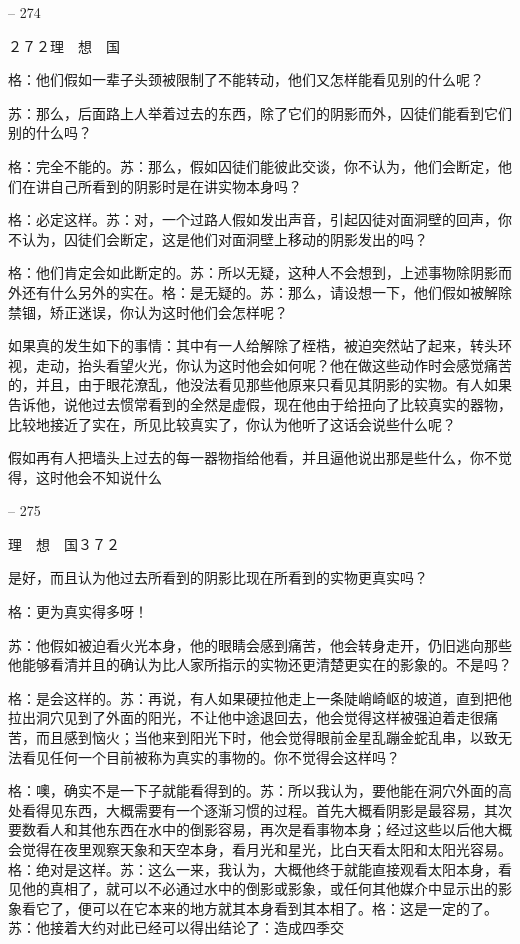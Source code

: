 \documentclass[11pt,oneside]{book}
\begin{document}
\begin{common-format}
    

-- 274

    ２７２理　想　国

    格：他们假如一辈子头颈被限制了不能转动，他们又怎样能看见别的什么呢？

    苏：那么，后面路上人举着过去的东西，除了它们的阴影而外，囚徒们能看到它们别的什么吗？

    格：完全不能的。苏：那么，假如囚徒们能彼此交谈，你不认为，他们会断定，他们在讲自己所看到的阴影时是在讲实物本身吗？

    格：必定这样。苏：对，一个过路人假如发出声音，引起囚徒对面洞壁的回声，你不认为，囚徒们会断定，这是他们对面洞壁上移动的阴影发出的吗？

    格：他们肯定会如此断定的。苏：所以无疑，这种人不会想到，上述事物除阴影而外还有什么另外的实在。格：是无疑的。苏：那么，请设想一下，他们假如被解除禁锢，矫正迷误，你认为这时他们会怎样呢？

    如果真的发生如下的事情：其中有一人给解除了桎梏，被迫突然站了起来，转头环视，走动，抬头看望火光，你认为这时他会如何呢？他在做这些动作时会感觉痛苦的，并且，由于眼花潦乱，他没法看见那些他原来只看见其阴影的实物。有人如果告诉他，说他过去惯常看到的全然是虚假，现在他由于给扭向了比较真实的器物，比较地接近了实在，所见比较真实了，你认为他听了这话会说些什么呢？

    假如再有人把墙头上过去的每一器物指给他看，并且逼他说出那是些什么，你不觉得，这时他会不知说什么

    

-- 275

    理　想　国３７２

    是好，而且认为他过去所看到的阴影比现在所看到的实物更真实吗？

    格：更为真实得多呀！

    苏：他假如被迫看火光本身，他的眼睛会感到痛苦，他会转身走开，仍旧逃向那些他能够看清并且的确认为比人家所指示的实物还更清楚更实在的影象的。不是吗？

    格：是会这样的。苏：再说，有人如果硬拉他走上一条陡峭崎岖的坡道，直到把他拉出洞穴见到了外面的阳光，不让他中途退回去，他会觉得这样被强迫着走很痛苦，而且感到恼火；当他来到阳光下时，他会觉得眼前金星乱蹦金蛇乱串，以致无法看见任何一个目前被称为真实的事物的。你不觉得会这样吗？

    格：噢，确实不是一下子就能看得到的。苏：所以我认为，要他能在洞穴外面的高处看得见东西，大概需要有一个逐渐习惯的过程。首先大概看阴影是最容易，其次要数看人和其他东西在水中的倒影容易，再次是看事物本身；经过这些以后他大概会觉得在夜里观察天象和天空本身，看月光和星光，比白天看太阳和太阳光容易。格：绝对是这样。苏：这么一来，我认为，大概他终于就能直接观看太阳本身，看见他的真相了，就可以不必通过水中的倒影或影象，或任何其他媒介中显示出的影象看它了，便可以在它本来的地方就其本身看到其本相了。格：这是一定的了。苏：他接着大约对此已经可以得出结论了：造成四季交


\end{common-format}
\end{document}
